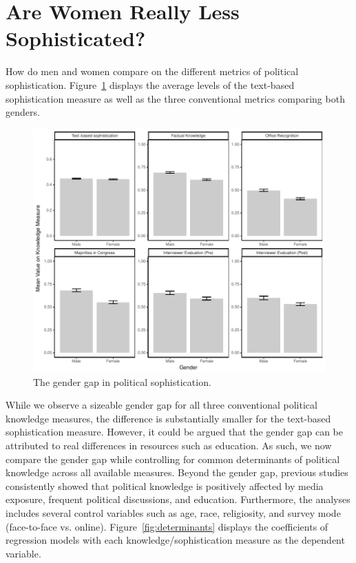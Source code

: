 \documentclass[12pt]{article}
\begin{document}
\section*{Are Women Really Less Sophisticated?}

How do men and women compare on the different metrics of political sophistication. Figure~\ref{fig:meandiff} displays the average levels of the text-based sophistication measure as well as the three conventional metrics comparing both genders.

\begin{figure}[h]\centering
\includegraphics{../fig/meandiff.pdf}
\caption{The gender gap in political sophistication.}\label{fig:meandiff}
\end{figure}

While we observe a sizeable gender gap for all three conventional political knowledge measures, the difference is substantially smaller for the text-based sophistication measure. However, it could be argued that the gender gap can be attributed to real differences in resources such as education. As such, we now compare the gender gap while controlling for common determinants of political knowledge across all available measures. Beyond the gender gap, previous studies consistently showed that political knowledge is positively affected by media exposure, frequent political discussions, and education. Furthermore, the analyses includes several control variables such as age, race, religiosity, and survey mode (face-to-face vs. online). Figure~\ref{fig:determinants} displays the coefficients of regression models with each knowledge/sophistication measure as the dependent variable.
\end{document}
